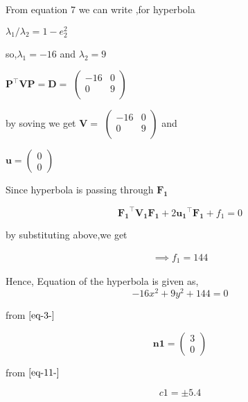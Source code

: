 \documentclass[journal,12pt,twocolumn]
{IEEEtran}
\let\vec\mathbf
\newcommand{\myvec}[1]{\ensuremath{\begin{pmatrix}#1\end{pmatrix}}}
\begin{document}
\begin{center}
From equation 7 we can write ,for hyperbola
\end {center}
\begin{center}
$\lambda_1/\lambda_2=1-e_2^2$
\end{center}
\begin{center}
so,$\lambda_1=-16$ and $\lambda_2=9$
\end{center}
\begin{center}
$\vec{P}^{\top}\vec{V}\vec{P} = \vec{D}=$ $\begin{pmatrix} 
	-16 & 0 \\
	0 & 9 \\
	\end{pmatrix} \hspace{1cm}$
\end{center}
\begin{center}
by soving we get
$\vec{V}=$ $\begin{pmatrix} 
	-16 & 0 \\
	0 & 9 \\
	\end{pmatrix} $ and
\end{center}
\begin{center}
$\vec{u} = \myvec{0 \\ 0}$
\end{center} 
\begin{center}
Since hyperbola is passing through $\vec{F_1}$
\end{center}
\begin{equation}
\vec{F_1}^{\top}\vec{V_1}\vec{F_1}+2\vec{u_1}^{\top}\vec{F_1}+f_1=0 
\label{eq-18-}
\end{equation} \vspace{1mm}
\begin{center}
by substituting above,we get
\end{center}
\begin{gather*}
\implies f_1 = 144
\end{gather*}

Hence, Equation of the hyperbola is given as,
\begin{equation}
-16x^2+9y^2+144=0
\label{eq-20-}
\end{equation}
\begin{center}
from $\eqref{eq-3-}$
\end{center}
\begin{equation}
\vec{n1} = \myvec{3 \\ 0}
\end{equation}
\begin{center}
from $\eqref{eq-11-}$
\end{center}
\begin{equation}
c1 = \pm 5.4
\label{eq-12-}
\end{equation}
\end{document}

